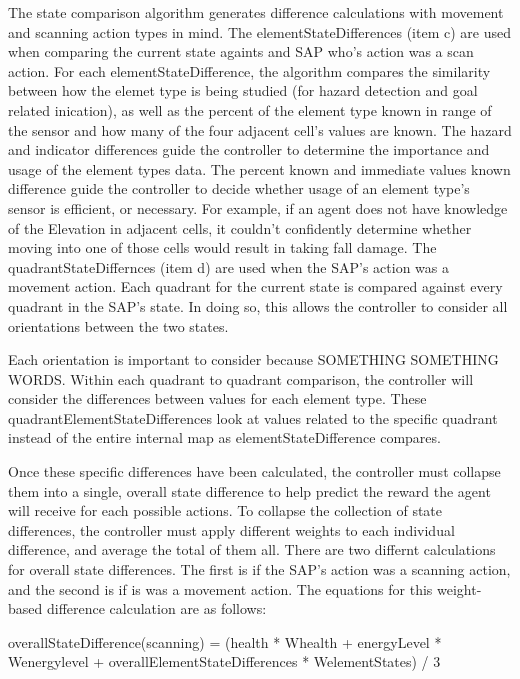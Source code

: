 The state comparison algorithm generates difference calculations with movement and scanning action types in mind.
The elementStateDifferences (item c) are used when comparing the current state againts and SAP who's action was a scan action.
For each elementStateDifference, the algorithm compares the similarity between how the elemet type is being studied (for hazard detection and goal related inication), as well as the percent of the element type known in range of the sensor and how many of the four adjacent cell's values are known.
The hazard and indicator differences guide the controller to determine the importance and usage of the element types data.
The percent known and immediate values known difference guide the controller to decide whether usage of an element type's sensor is efficient, or necessary.
For example, if an agent does not have knowledge of the Elevation in adjacent cells, it couldn't confidently determine whether moving into one of those cells would result in taking fall damage.
The quadrantStateDiffernces (item d) are used when the SAP's action was a movement action.
Each quadrant for the current state is compared against every quadrant in the SAP's state.
In doing so, this allows the controller to consider all orientations between the two states.


Each orientation is important to consider because SOMETHING SOMETHING WORDS.
Within each quadrant to quadrant comparison, the controller will consider the differences between values for each element type.
These quadrantElementStateDifferences look at values related to the specific quadrant instead of the entire internal map as elementStateDifference compares.

Once these specific differences have been calculated, the controller must collapse them into a single, overall state difference to help predict the reward the agent will receive for each possible actions.
To collapse the collection of state differences, the controller must apply different weights to each individual difference, and average the total of them all.
There are two differnt calculations for overall state differences.
The first is if the SAP's action was a scanning action, and the second is if is was a movement action.
The equations for this weight-based difference calculation are as follows:

overallStateDifference(scanning) = (health * Whealth + energyLevel * Wenergylevel + overallElementStateDifferences * WelementStates) / 3


